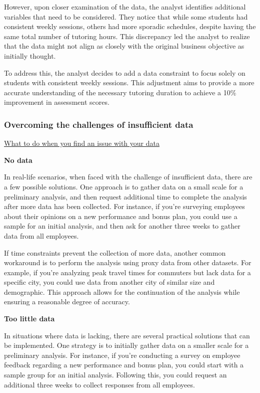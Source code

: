 \documentclass[]{article}
\begin{document}
However, upon closer examination of the data, the analyst identifies additional variables that need to be considered. They notice that while some students had consistent weekly sessions, others had more sporadic schedules, despite having the same total number of tutoring hours. This discrepancy led the analyst to realize that the data might not align as closely with the original business objective as initially thought.

To address this, the analyst decides to add a data constraint to focus solely on students with consistent weekly sessions. This adjustment aims to provide a more accurate understanding of the necessary tutoring duration to achieve a 10\% improvement in assessment scores.

\subsubsection{Overcoming the challenges of insufficient data}
\uline{What to do when you find an issue with your data} \par
\textbf{No data}

In real-life scenarios, when faced with the challenge of insufficient data, there are a few possible solutions. One approach is to gather data on a small scale for a preliminary analysis, and then request additional time to complete the analysis after more data has been collected. For instance, if you're surveying employees about their opinions on a new performance and bonus plan, you could use a sample for an initial analysis, and then ask for another three weeks to gather data from all employees.

If time constraints prevent the collection of more data, another common workaround is to perform the analysis using proxy data from other datasets. For example, if you're analyzing peak travel times for commuters but lack data for a specific city, you could use data from another city of similar size and demographic. This approach allows for the continuation of the analysis while ensuring a reasonable degree of accuracy.

\textbf{Too little data}

In situations where data is lacking, there are several practical solutions that can be implemented. One strategy is to initially gather data on a smaller scale for a preliminary analysis. For instance, if you're conducting a survey on employee feedback regarding a new performance and bonus plan, you could start with a sample group for an initial analysis. Following this, you could request an additional three weeks to collect responses from all employees.
\end{document}
